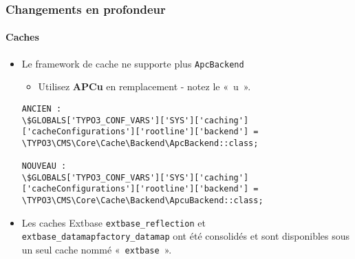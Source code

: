 \begin{frame}[fragile]
	\frametitle{Changements en profondeur}
	\framesubtitle{Caches}

	\lstset{basicstyle=\tiny\ttfamily}

	\begin{itemize}
		\item Le framework de cache ne supporte plus \texttt{ApcBackend}

			\begin{itemize}\smaller
				\item[\ding{228}] Utilisez \textbf{APCu} en remplacement - notez le «~u~».
			\end{itemize}

\begin{lstlisting}
ANCIEN :
\$GLOBALS['TYPO3_CONF_VARS']['SYS']['caching']['cacheConfigurations']['rootline']['backend'] =
\TYPO3\CMS\Core\Cache\Backend\ApcBackend::class;

NOUVEAU :
\$GLOBALS['TYPO3_CONF_VARS']['SYS']['caching']['cacheConfigurations']['rootline']['backend'] = \TYPO3\CMS\Core\Cache\Backend\ApcuBackend::class;
	\end{lstlisting}

		\item Les caches Extbase \texttt{extbase\_reflection} et \texttt{extbase\_datamapfactory\_datamap}
			ont été consolidés et sont disponibles sous un seul cache nommé «~\texttt{extbase}~».

	\end{itemize}

\end{frame}


